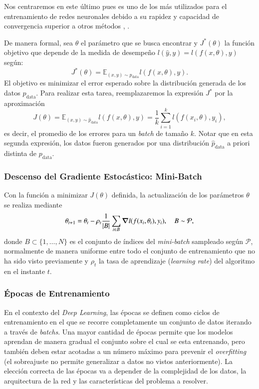 Nos centraremos en este último pues es uno de los más utilizados para el entrenamiento de redes neuronales debido a su rapidez y capacidad de convergencia superior a otros métodos \cite{WILSON20031429}, \cite{article}.

\vspace{0.2cm}

De manera formal, sea $\theta$ el parámetro que se busca encontrar y $J^{*}(\theta)$ la función objetivo que depende de la medida de desempeño $l(\hat{y},y) = l(f(x , \theta),y) $ según: 
\[
J^{*}(\theta) = \mathbb{E}_{(x,y) \sim p_{\text{data}}} l(f(x , \theta),y) .
\]
El objetivo es minimizar el error esperado sobre la distribución generada de los datos $p_{\text{data}}$. Para realizar esta tarea, reemplazaremos la expresión $J^{*}$ por la aproximación 
\[
J(\theta) = \mathbb{E}_{(x,y) \sim \hat{p}_{\text{data}}} l(f(x , \theta),y) = \frac{1}{k}\sum_{i=1}^{k}l(f(x_i , \theta),y_i) , 
\]
es decir, el promedio de los errores para un \textit{batch} de tamaño $k$. Notar que en esta segunda expresión, los datos fueron generados por una distribución $\hat{p}_{\text{data}}$ a priori distinta de $p_{\text{data}}$. 

\subsubsection{Descenso del Gradiente Estocástico: Mini-Batch}

Con la función a minimizar $J(\theta)$ definida, la actualización de los parámetros $\theta$ se realiza mediante 
\[
\theta_{t+1} = \theta_t - \rho_t \frac{1}{|B|}\sum_{i \in B}\grad l(f(x_i , \theta_t),y_i) , \quad B \sim \mathcal{P} ,  
\]
donde $B \subset \{1 , \dots , N\}$ es el conjunto de índices del \textit{mini-batch} sampleado según $\mathcal{P}$, normalmente de manera uniforme entre todo el conjunto de entrenamiento que no ha sido visto previamente y $\rho_t$ la tasa de aprendizaje (\textit{learning rate}) del algoritmo en el instante $t$. 

\subsubsection{Épocas de Entrenamiento}

En el contexto del \textit{Deep Learning}, las épocas se definen como ciclos de entrenamiento en el que se recorre completamente un conjunto de datos iterando a través de \textit{batchs}. Una mayor cantidad de épocas permite que los modelos aprendan de manera gradual el conjunto sobre el cual se esta entrenando, pero también deben estar acotadas a un número máximo para prevenir el \textit{overfitting} (el sobreajuste no permite generalizar a datos no vistos anteriormente). La elección correcta de las épocas va a depender de la complejidad de los datos, la arquitectura de la red y las características del problema a resolver. 

